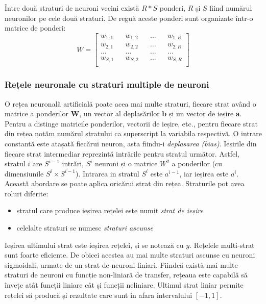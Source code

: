 Între două straturi de neuroni vecini există $R*S$ ponderi, $R$ și $S$ fiind numărul neuronilor pe cele două straturi. De reguă aceste ponderi sunt organizate într-o matrice de ponderi:
\begin{equation}
	W = \begin{bmatrix}
		w_{1,1} && w_{1,2} && \dots && w_{1,R} \\
		w_{2,1} && w_{2,2} && \dots && w_{2,R} \\
		\dots && \dots && \dots && \dots\\
		w_{S,1} && w_{S,2} && \dots && w_{S, R} \\
	\end{bmatrix}
\end{equation}



\subsubsection{Rețele neuronale cu straturi multiple de neuroni}
O rețea neuronală artificială poate acea mai multe straturi, fiecare strat având o matrice a ponderilor \textbf{W}, un vector al deplasărilor \textbf{b} și un vector de ieșire \textbf{a}. Pentru a distinge matricile ponderilor, vectorii de ieșire, etc., pentru fiecare strat din rețea notăm numărul stratului ca superscript la variabila respectivă. O intrare constantă este atașată fiecărui neuron, asta fiindu-i \textit{deplasarea (bias)}. Ieșirile din fiecare strat intermediar reprezintă intrările pentru stratul următor. Astfel, stratul $i$ are $S^{i-1}$ intrări, $S^{i}$ neuroni și o matrice $W^2$ a ponderilor (cu dimensiunile $S^{i}\times S^{i-1}$). Intrarea in stratul $S^{i}$ este $a^{i-1}$, iar ieșirea este $a^{i}$. Această abordare se poate aplica oricărui strat din rețea.\newline
Straturile pot avea roluri diferite:
\begin{itemize}
	\item stratul care produce ieșirea rețelei este numit \textit{strat de ieșire}
	\item celelalte straturi se numesc \textit{straturi ascunse}
\end{itemize}
Ieșirea ultimului strat este ieșirea rețelei, și se notează cu $y$. Rețelele multi-strat sunt foarte eficiente. De obicei acestea au mai multe straturi ascunse cu neuroni sigmoidali, urmate de un strat de neuroni liniari. Fiindcă există mai multe straturi de neuroni cu funcție non-liniară de transfer, rețeaua este capabilă să învețe atât funcții liniare cât și funcții neliniare. Ultimul strat liniar permite rețelei să producă și rezultate care sunt în afara intervalului $[-1, 1]$.


